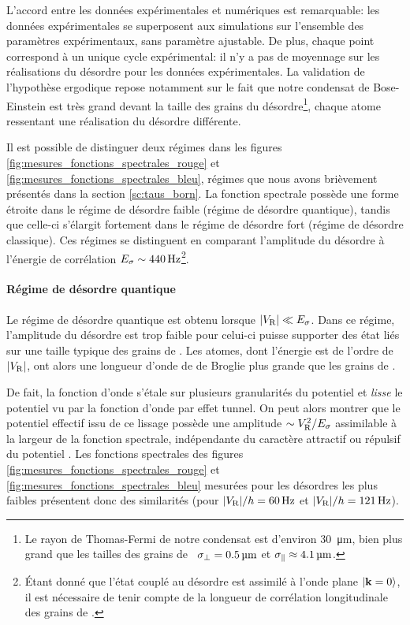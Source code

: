 L'accord entre les données expérimentales et numériques est remarquable: les données expérimentales se superposent aux simulations sur l'ensemble des paramètres expérimentaux, sans paramètre ajustable. De plus, chaque point correspond à un unique cycle expérimental: il n'y a pas de moyennage sur les réalisations du désordre pour les données expérimentales. La validation de l'hypothèse ergodique repose notamment sur le fait que notre condensat de Bose-Einstein est très grand devant la taille des grains du désordre\footnote{Le rayon de Thomas-Fermi de notre condensat est d'environ \SI{30}{\micro\metre}, bien plus grand que les tailles des grains de \speckle\ $\sigma_{\perp}=\SI{0.5}{\micro\metre}$ et $\sigma_{\parallel}\approx\SI{4.1}{\micro\metre}$.}, chaque atome ressentant une réalisation du désordre différente.

Il est possible de distinguer deux régimes dans les figures \ref{fig:mesures_fonctions_spectrales_rouge} et \ref{fig:mesures_fonctions_spectrales_bleu}, régimes que nous avons brièvement présentés dans la section \ref{sc:taus_born}. La fonction spectrale possède une forme étroite dans le régime de désordre faible (régime de désordre quantique), tandis que celle-ci s'élargit fortement dans le régime de désordre fort (régime de désordre classique). Ces régimes se distinguent en comparant l'amplitude du désordre à l'énergie de corrélation $E_{\sigma}\sim\SI{440}{\hertz}$\footnote{Étant donné que l'état couplé au désordre est assimilé à l'onde plane $\protect\left| \mathbf{k}=0 \right\rangle$, il est nécessaire de tenir compte de la longueur de corrélation longitudinale des grains de \speckle .}.





\paragraph*{Régime de désordre quantique}
Le régime de désordre quantique est obtenu lorsque $|V_{\mathrm{R}}|\ll E_{\sigma}$. Dans ce régime, l'amplitude du désordre est trop faible pour celui-ci puisse supporter des état liés sur une taille typique des grains de \speckle . Les atomes, dont l'énergie est de l'ordre de $|V_{\mathrm{R}}|$, ont alors une longueur d'onde de de Broglie plus grande que les grains de \speckle . 

De fait, la fonction d'onde s'étale sur plusieurs granularités du potentiel et \emph{lisse} le potentiel vu par la fonction d'onde par effet tunnel. On peut alors montrer que le potentiel effectif issu de ce lissage possède une amplitude $\sim V_{\mathrm{R}}^2/E_{\sigma}$ assimilable à la largeur de la fonction spectrale, indépendante du caractère attractif ou répulsif du potentiel \citep{bloch2012quantum}\citep{pasek2017anderson}. Les fonctions spectrales des figures \ref{fig:mesures_fonctions_spectrales_rouge} et \ref{fig:mesures_fonctions_spectrales_bleu} mesurées pour les désordres les plus faibles présentent donc des similarités (pour $|V_{\mathrm{R}}|/h=\SI{60}{\hertz}$ et $|V_{\mathrm{R}}|/h=\SI{121}{\hertz}$). 

